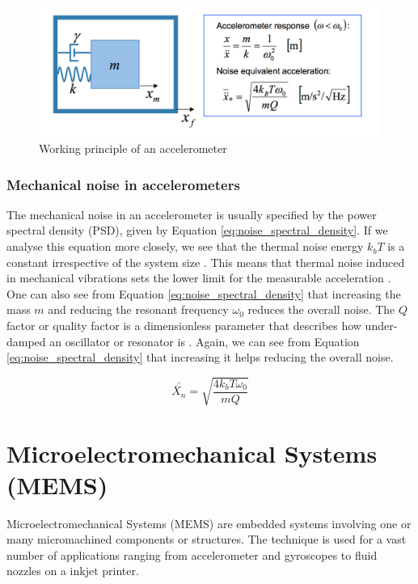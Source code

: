 \begin{figure}[h]
\centering
\includegraphics[scale=0.5]{fig/accelerometer_working_principle.png}
\caption{Working principle of an accelerometer \cite[~p.34]{kaajakari09}}
\label{fig:accel_working_principle}
\end{figure}

\subsubsection{Mechanical noise in accelerometers}
\label{sec:mechanical_noise}
The mechanical noise in an accelerometer is usually specified by the power spectral density (PSD), given by Equation \ref{eq:noise_spectral_density}. If we analyse this equation more closely, we see that the thermal noise energy $k_b T$ is a constant irrespective of the system size \cite[~p.13]{kaajakari09}. This means that thermal noise induced in mechanical vibrations sets the lower limit for the measurable acceleration \cite[~p.41]{kaajakari09}. One can also see from Equation \ref{eq:noise_spectral_density} that increasing the mass $m$ and reducing the resonant frequency $\omega_0$ reduces the overall noise. The $Q$ factor or quality factor is a dimensionless parameter that describes how under-damped an oscillator or resonator is \cite{resonance}. Again, we can see from Equation \ref{eq:noise_spectral_density} that increasing it helps reducing the overall noise.

\begin{equation}
\bar{\ddot{X_n}} = \sqrt{\frac{4 k_b T \omega_0}{mQ}}
\label{eq:noise_spectral_density}
\end{equation}

\section{Microelectromechanical Systems (MEMS)}

Microelectromechanical Systems (MEMS) are embedded systems involving one or many micromachined components or structures\cite[p.~3]{maluf04}. The technique is used for a vast number of applications ranging from accelerometer and gyroscopes to fluid nozzles on a inkjet printer.

